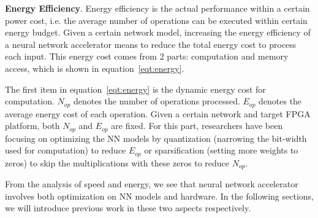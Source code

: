 \textbf{Energy Efficiency}. Energy efficiency is the actual performance within a certain power cost, i.e. the average number of operations can be executed within certain energy budget. Given a certain network model, increasing the energy efficiency of a neural network accelerator means to reduce the total energy cost to process each input. This energy cost comes from 2 parts: computation and memory access, which is shown in equation~\ref{eqt:energy}. 


The first item in equation~\ref{eqt:energy} is the dynamic energy cost for computation. $N_{op}$ denotes the number of operations processed. $E_{op}$ denotes the average energy cost of each operation. Given a certain network and target FPGA platform, both $N_{op}$ and $E_{op}$ are fixed. For this part, researchers have been focusing on optimizing the NN models by quantization (narrowing the bit-width used for computation) to reduce $E_{op}$ or sparsification (setting more weights to zeros) to skip the multiplications with these zeros to reduce $N_{op}$.


From the analysis of speed and energy, we see that neural network accelerator involves both optimization on NN models and hardware. In the following sections, we will introduce previous work in these two aspects respectively.
